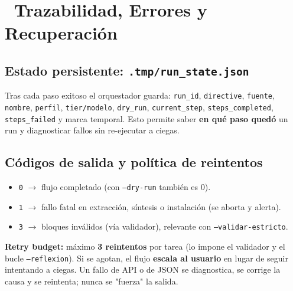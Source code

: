 \documentclass[11pt,a4paper]{article}
\newcommand{\iconotexto}[2]{\textcolor{cyanNeon}{\faIcon{#1}}~#2}
\begin{document}
\section{\iconotexto{first-aid}{Trazabilidad, Errores y Recuperación}}

\subsection{Estado persistente: \texttt{.tmp/run\_state.json}}
Tras cada paso exitoso el orquestador guarda: \texttt{run\_id}, \texttt{directive},
\texttt{fuente}, \texttt{nombre}, \texttt{perfil}, \texttt{tier/modelo}, \texttt{dry\_run},
\texttt{current\_step}, \texttt{steps\_completed}, \texttt{steps\_failed} y marca temporal.
Esto permite saber \textbf{en qué paso quedó} un run y diagnosticar fallos sin re-ejecutar a
ciegas.

\subsection{Códigos de salida y política de reintentos}
\begin{itemize}[leftmargin=*]
  \item \texttt{0} $\to$ flujo completado (con \texttt{--dry-run} también es 0).
  \item \texttt{1} $\to$ fallo fatal en extracción, síntesis o instalación (se aborta y alerta).
  \item \texttt{3} $\to$ bloques inválidos (vía validador), relevante con \texttt{--validar-estricto}.
\end{itemize}

\begin{cajaAlerta}
\textbf{Retry budget:} máximo \textbf{3 reintentos} por tarea (lo impone el validador y el
bucle \texttt{--reflexion}). Si se agotan, el flujo \textbf{escala al usuario} en lugar de seguir
intentando a ciegas. Un fallo de API o de JSON se diagnostica, se corrige la causa y se
reintenta; nunca se "fuerza" la salida.
\end{cajaAlerta}
\end{document}
